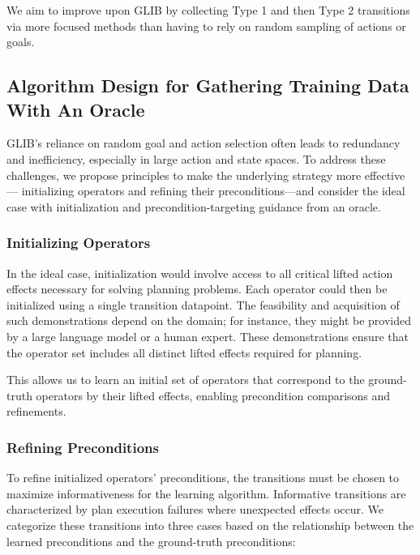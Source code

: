 We aim to improve upon GLIB by collecting Type 1 and then Type 2 transitions via more focused methods than having to rely on random sampling of actions or goals.

\subsection{Algorithm Design for Gathering Training Data With An Oracle}
GLIB's reliance on random goal and action selection often leads to redundancy and inefficiency, especially in large action and state spaces. To address these challenges, we propose principles to make the underlying strategy more effective--- initializing operators and refining their preconditions---and consider the ideal case with initialization and precondition-targeting guidance from an oracle.

\subsubsection{Initializing Operators}
In the ideal case, initialization would involve access to all critical lifted action effects necessary for solving planning problems. Each operator could then be initialized using a single transition datapoint. The feasibility and acquisition of such demonstrations depend on the domain; for instance, they might be provided by a large language model or a human expert. These demonstrations ensure that the operator set includes all distinct lifted effects required for planning.

This allows us to learn an initial set of operators that correspond to the ground-truth operators by their lifted effects, enabling precondition comparisons and refinements.

\subsubsection{Refining Preconditions}

To refine initialized operators’ preconditions, the transitions must be chosen to maximize informativeness for the learning algorithm. Informative transitions are characterized by plan execution failures where unexpected effects occur. We categorize these transitions into three cases based on the relationship between the learned preconditions and the ground-truth preconditions:



